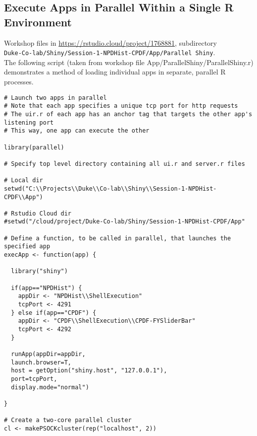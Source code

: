 \documentclass[10pt, letterpaper]{article}
\begin{document}
\begin{spacing}{1.0}
\subsection{Execute Apps in Parallel Within a Single R Environment}\label{sec:navparproc}

Workshop files in \url{https://rstudio.cloud/project/1768881}, subdirectory \\ \texttt{Duke-Co-lab/Shiny/Session-1-NPDHist-CPDF/App/Parallel Shiny}.\\

The following script (taken from workshop file App/ParallelShiny/ParallelShiny.r) demonstrates a method of loading individual apps in separate, parallel R processes.

\scriptsize
\begin{verbatim}
# Launch two apps in parallel
# Note that each app specifies a unique tcp port for http requests
# The uir.r of each app has an anchor tag that targets the other app's listening port
# This way, one app can execute the other

library(parallel)

# Specify top level directory containing all ui.r and server.r files

# Local dir
setwd("C:\\Projects\\Duke\\Co-lab\\Shiny\\Session-1-NPDHist-CPDF\\App")

# Rstudio Cloud dir
#setwd("/cloud/project/Duke-Co-lab/Shiny/Session-1-NPDHist-CPDF/App"

# Define a function, to be called in parallel, that launches the specified app
execApp <- function(app) {

  library("shiny")

  if(app=="NPDHist") {
    appDir <- "NPDHist\\ShellExecution"
    tcpPort <- 4291
  } else if(app=="CPDF") {
    appDir <- "CPDF\\ShellExecution\\CPDF-FYSliderBar"
    tcpPort <- 4292
  }

  runApp(appDir=appDir,
  launch.browser=T,
  host = getOption("shiny.host", "127.0.0.1"),
  port=tcpPort,
  display.mode="normal")

}

# Create a two-core parallel cluster
cl <- makePSOCKcluster(rep("localhost", 2))


\end{verbatim}
\end{spacing}
\end{document}
